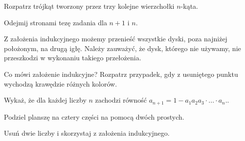 \newpage
{}

\begin{hints_list}

	\item Rozpatrz trójkąt tworzony przez trzy kolejne wierzchołki $n$-kąta.

	\item Odejmij stronami tezę zadania dla $n + 1$ i $n$.

	\item Z założenia indukcyjnego możemy przenieść wszystkie dyski, poza najniżej położonym, na drugą igłę. Należy zauważyć, że dysk, którego nie używamy, nie przeszkodzi w wykonaniu takiego przełożenia.

	\item Co mówi założenie indukcyjne? Rozpatrz przypadek, gdy z usuniętego punktu wychodzą krawędzie różnych kolorów.

	\item Wykaż, że dla każdej liczby $n$ zachodzi równość $a_{n + 1} = 1 - a_1a_2a_3\cdot ... \cdot a_{n}.$.

	\item Podziel planszę na cztery części na pomocą dwóch prostych.

	\item Usuń dwie liczby i skorzystaj z założenia indukcyjnego.
\end{hints_list}